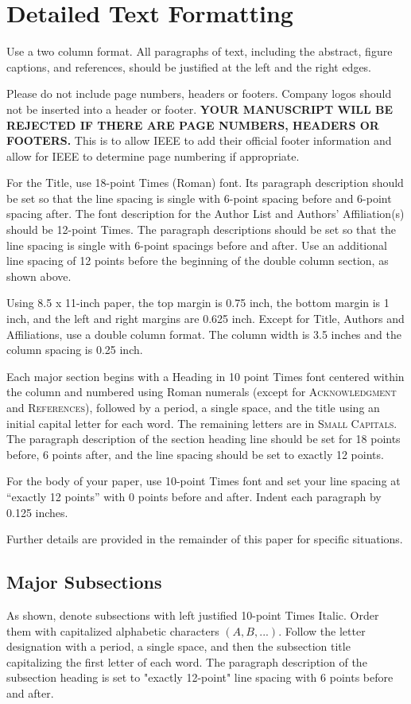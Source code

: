 \documentclass[conference]{./pvsctran}
\begin{document}
\section{Detailed Text Formatting}
Use a two column format.  All paragraphs of text, including the abstract, figure captions, and references, should be justified at the left and the right edges.

Please do not include page numbers, headers or footers.  Company logos should not be inserted into a header or footer.  \textbf{YOUR MANUSCRIPT WILL BE REJECTED IF THERE ARE PAGE NUMBERS, HEADERS OR FOOTERS.}  This is to allow IEEE to add their official footer information and allow for IEEE to determine page numbering if appropriate.

For the Title, use 18-point Times (Roman) font. Its paragraph description should be set so that the line spacing is single with 6-point spacing before and 6-point spacing after. The font description for the Author List and Authors' Affiliation(s) should be 12-point Times. The paragraph descriptions should be set so that the line spacing is single with 6-point spacings before and after. Use an additional line spacing of 12 points before the beginning of the double column section, as shown above.

Using 8.5 x 11-inch paper, the top margin is 0.75 inch, the bottom margin is 1 inch, and the left and right margins are
0.625 inch. Except for Title, Authors and Affiliations, use a double column format. The column width is 3.5 inches and the column spacing is 0.25 inch.

Each major section begins with a Heading in 10 point Times font centered within the column and numbered using Roman numerals (except for \textsc{Acknowledgment} and \textsc{References}), followed by a period, a single space, and the title using an initial capital letter for each word. The remaining letters are in \textsc{Small Capitals}. The paragraph description of the section heading line should be set for 18 points before, 6 points after, and the line spacing should be set to exactly 12 points.

For the body of your paper, use 10-point Times font and set your line spacing at ``exactly 12 points'' with 0 points before and after. Indent each paragraph by 0.125 inches. 

Further details are provided in the remainder of this paper for specific situations.

\subsection{ Major Subsections}
As shown, denote subsections with left justified 10-point Times Italic. Order them with capitalized alphabetic characters $(A, B,...)$. Follow the letter designation with a period, a single space, and then the subsection title capitalizing the first letter of each word. The paragraph description of the subsection heading is set to "exactly 12-point" line spacing with 6 points before and after.
\end{document}
